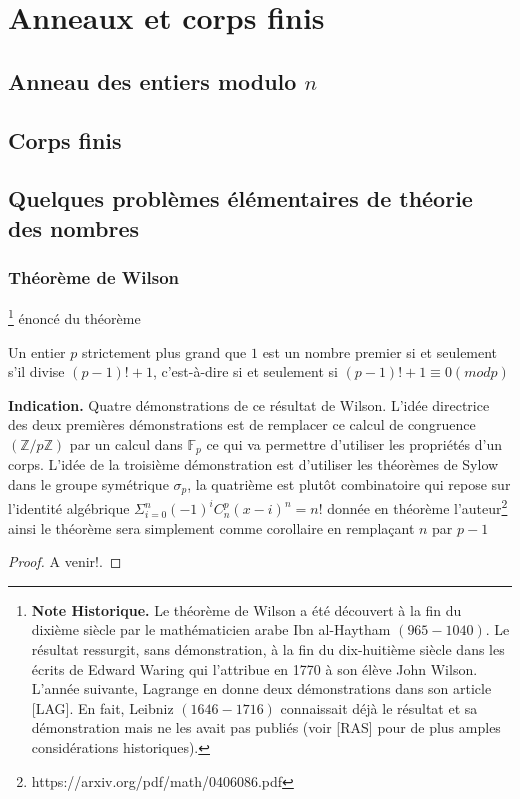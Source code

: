 \chapter{Anneaux et corps finis}
\section{Anneau des entiers modulo $n$}
\section{Corps finis}
\section{Quelques probl\`emes élémentaires de théorie des nombres}

\subsection{Théorème de Wilson}\footnote{\textbf{Note Historique.} Le théorème de Wilson a été découvert à la fin du dixième siècle par le mathématicien arabe Ibn al-Haytham $(965-1040)$. Le résultat ressurgit, sans démonstration, à la fin du dix-huitième siècle dans les écrits de Edward Waring qui l’attribue en 1770 à son élève John Wilson. L’année suivante, Lagrange en donne deux démonstrations dans son article [LAG]. En fait, Leibniz $(1646-1716)$ connaissait déjà le résultat et sa démonstration mais ne les avait pas publiés (voir [RAS] pour de plus amples considérations historiques).}
\'enoncé du théorème 
\begin{theorem}
 Un entier $p$ strictement plus grand que $1$ est un nombre premier si et seulement s'il divise $(p - 1)! + 1$, c'est-à-dire si et seulement si $(p-1)!+ 1 \equiv 0 (mod p)$
\end{theorem}
\textbf{Indication.}  Quatre démonstrations de ce résultat de Wilson. L'idée directrice des deux premières démonstrations est de remplacer ce calcul de congruence $(\mathbb{Z}/p\mathbb{Z})$ par un calcul dans $\mathbb{F}_{p}$ ce qui va permettre d'utiliser les propriétés d’un corps. L'idée de la troisième démonstration est d’utiliser les théorèmes de Sylow dans le groupe symétrique $\mathbb{\sigma}_{p}$, la quatrième est plutôt combinatoire qui repose sur l'identité algébrique $\Sigma_{i=0}^{n} (-1)^{i} C_n^{p}(x-i)^n = n!$ donnée en théorème l'auteur\footnote{https://arxiv.org/pdf/math/0406086.pdf} ainsi le théorème sera simplement comme
corollaire en remplaçant $n$ par $p-1$
\begin{proof}
A venir!.
\end{proof}
